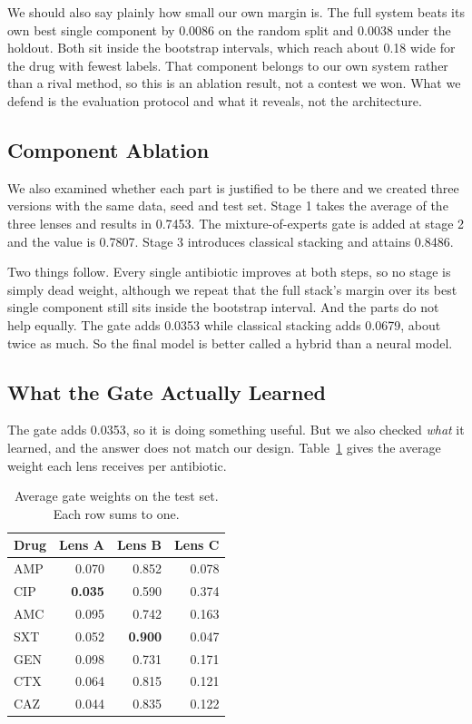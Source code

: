 \documentclass[conference]{IEEEtran}
\begin{document}
We should also say plainly how small our own margin is. The full system beats its
own best single component by 0.0086 on the random split and 0.0038 under the
holdout. Both sit inside the bootstrap intervals, which reach about 0.18 wide for
the drug with fewest labels. That component belongs to our own system rather than a
rival method, so this is an ablation result, not a contest we won. What we defend
is the evaluation protocol and what it reveals, not the architecture.

\subsection{Component Ablation}

We also examined whether each part is justified to be there and we created three
versions with the same data, seed and test set. Stage 1 takes the average of the
three lenses and results in 0.7453. The mixture-of-experts gate is added at stage 2
and the value is 0.7807. Stage 3 introduces classical stacking and attains 0.8486.

Two things follow. Every single antibiotic improves at both steps, so no stage is
simply dead weight, although we repeat that the full stack's margin over its best
single component still sits inside the bootstrap interval. And the parts do not
help equally. The gate adds 0.0353 while classical stacking adds 0.0679, about
twice as much. So the final model is better called a hybrid than a neural model.

\subsection{What the Gate Actually Learned}

The gate adds 0.0353, so it is doing something useful. But we also checked
\textit{what} it learned, and the answer does not match our design.
Table~\ref{tab:gate} gives the average weight each lens receives per antibiotic.

\begin{table}[t]
\caption{Average gate weights on the test set. Each row sums to one.}
\label{tab:gate}
\centering
\small
\setlength{\tabcolsep}{4pt}
\renewcommand{\arraystretch}{1.15}
\begin{tabular}{|l|r|r|r|}
\hline
\rowcolor{headgrey}
\textbf{Drug} & \textbf{Lens A} & \textbf{Lens B} & \textbf{Lens C} \\ \hline
AMP & 0.070 & 0.852 & 0.078 \\ \hline
CIP & \textbf{0.035} & 0.590 & 0.374 \\ \hline
AMC & 0.095 & 0.742 & 0.163 \\ \hline
SXT & 0.052 & \textbf{0.900} & 0.047 \\ \hline
GEN & 0.098 & 0.731 & 0.171 \\ \hline
CTX & 0.064 & 0.815 & 0.121 \\ \hline
CAZ & 0.044 & 0.835 & 0.122 \\ \hline
\end{tabular}
\renewcommand{\arraystretch}{1.0}
\end{table}
\end{document}
